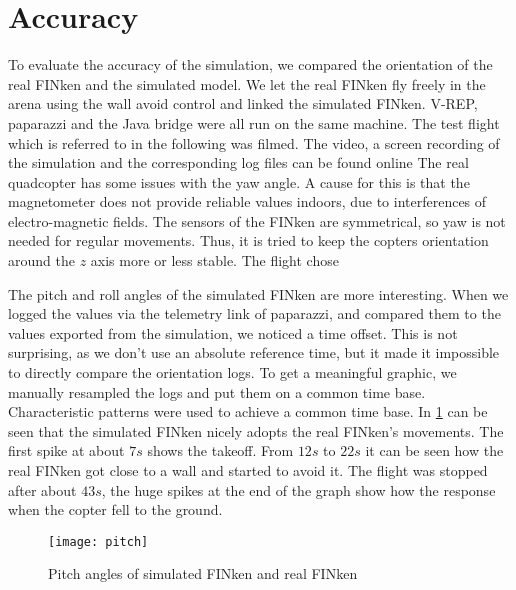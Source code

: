 \section{Accuracy}

To evaluate the accuracy of the simulation, we compared the orientation of the real FINken and the simulated model.  
We let the real FINken fly freely in the arena using the wall avoid control and linked the simulated FINken.
V-REP, paparazzi and the Java bridge were all run on the same machine.
The test flight which is referred to in the following was filmed.
The video, a screen recording of the simulation and the corresponding log files can be found online  
The real quadcopter has some issues with the yaw angle. 
A cause for this is that the magnetometer does not provide reliable values indoors, due to interferences of electro-magnetic fields.
The sensors of the FINken are symmetrical, so yaw is not needed for regular movements.
Thus, it is tried to keep the copters orientation around the $z$ axis more or less stable.
The flight chose

The pitch and roll angles of the simulated FINken are more interesting.
When we logged the values via the telemetry link of paparazzi, and compared them to the values exported from the simulation, we noticed a time offset. 
This is not surprising, as we don't use an absolute reference time, but it made it impossible to directly compare the orientation logs.
To get a meaningful graphic, we manually resampled the logs and put them on a common time base.
Characteristic patterns were used to achieve a common time base.
In \ref{pic:pitchResponse} can be seen that the simulated FINken nicely adopts the real FINken's movements. 
The first spike at about $7s$ shows the takeoff. 
From $12s$ to $22s$ it can be seen how the real FINken got close to a wall and started to avoid it. 
The flight was stopped after about $43s$, the huge spikes at the end of the graph show how the response when the copter fell to the ground.
\begin{figure}
	\begin{center}
	\texttt{[image: pitch]}
	\caption{Pitch angles of simulated FINken and real FINken}
	\label{pic:pitchResponse}
	\end{center}
\end{figure}

